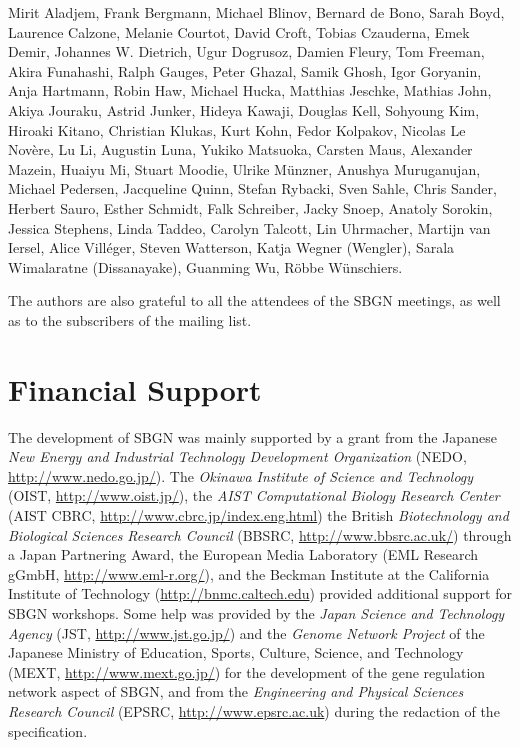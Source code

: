 Mirit Aladjem, Frank Bergmann, Michael Blinov, Bernard de Bono, Sarah Boyd, Laurence Calzone, Melanie Courtot, David Croft, Tobias Czauderna, Emek Demir, Johannes W. Dietrich, Ugur Dogrusoz, Damien Fleury, Tom Freeman, Akira Funahashi, Ralph Gauges, Peter Ghazal, Samik Ghosh, Igor Goryanin, Anja Hartmann, Robin Haw, Michael Hucka, Matthias Jeschke, Mathias John, Akiya Jouraku, Astrid Junker, Hideya Kawaji, Douglas Kell, Sohyoung Kim, Hiroaki Kitano, Christian Klukas, Kurt Kohn, Fedor Kolpakov, Nicolas Le Nov\`{e}re, Lu Li, Augustin Luna, Yukiko Matsuoka, Carsten Maus, Alexander Mazein, Huaiyu Mi, Stuart Moodie, Ulrike M\"unzner, Anushya Muruganujan, Michael Pedersen, Jacqueline Quinn, Stefan Rybacki, Sven Sahle, Chris Sander, Herbert Sauro, Esther Schmidt, Falk Schreiber, Jacky Snoep, Anatoly Sorokin, Jessica Stephens, Linda Taddeo, Carolyn Talcott, Lin Uhrmacher, Martijn van Iersel, Alice Vill\'{e}ger, Steven Watterson, Katja Wegner (Wengler), Sarala Wimalaratne (Dissanayake), Guanming Wu, R\"obbe W\"unschiers.

The authors are also grateful to all the attendees of the SBGN meetings, as 
well as to the subscribers of the  mailing list.


\section{Financial Support}

The development of SBGN was mainly supported by a grant from the Japanese \emph{New Energy and Industrial Technology Development Organization} (NEDO, \url{http://www.nedo.go.jp/}).  The \emph{Okinawa Institute of Science and Technology} (OIST, \url{http://www.oist.jp/}), the \emph{AIST Computational Biology Research Center} (AIST CBRC, \url{http://www.cbrc.jp/index.eng.html}) the British \emph{Biotechnology and Biological Sciences Research Council} (BBSRC, \url{http://www.bbsrc.ac.uk/}) through a Japan Partnering Award, the European Media Laboratory (EML Research gGmbH, \url{http://www.eml-r.org/}), and the Beckman Institute at the California Institute of Technology (\url{http://bnmc.caltech.edu}) provided additional support for SBGN workshops.  Some help was provided by the \emph{Japan Science and Technology Agency} (JST, \url{http://www.jst.go.jp/}) and the \emph{Genome Network Project} of the Japanese Ministry of Education, Sports, Culture, Science, and Technology (MEXT, \url{http://www.mext.go.jp/}) for the development of the gene regulation network aspect of SBGN, and from the \emph{Engineering and Physical Sciences Research Council} (EPSRC, \url{http://www.epsrc.ac.uk}) during the redaction of the specification.
